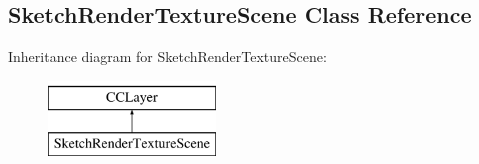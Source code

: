 \hypertarget{interface_sketch_render_texture_scene}{\subsection{Sketch\-Render\-Texture\-Scene Class Reference}
\label{dc/d61/interface_sketch_render_texture_scene}
}
Inheritance diagram for Sketch\-Render\-Texture\-Scene\-:\begin{figure}[H]
\begin{center}
\leavevmode
\includegraphics[height=2.000000cm]{dc/d61/interface_sketch_render_texture_scene}
\end{center}
\end{figure}
